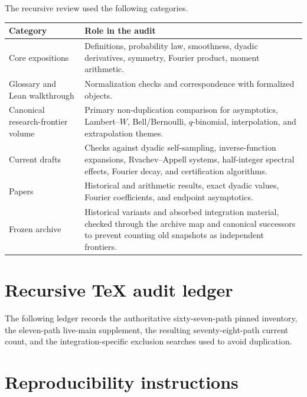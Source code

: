 \documentclass[11pt,oneside]{article}
\theoremstyle{definition}
\theoremstyle{remark}
\newcommand{\1}{\mathbf 1}
\begin{document}
The recursive review used the following categories.
\begin{longtable}{@{}p{}p{}@{}}
\toprule
Category&Role in the audit\\
\midrule
Core expositions&Definitions, probability law, smoothness, dyadic derivatives, symmetry,
Fourier product, moment arithmetic.\\
Glossary and Lean walkthrough&Normalization checks and correspondence with formalized
objects.\\
Canonical research-frontier volume&Primary non-duplication comparison for asymptotics,
Lambert--\(W\), Bell/Bernoulli, \(q\)-binomial, interpolation, and extrapolation themes.\\
Current drafts&Checks against dyadic self-sampling, inverse-function expansions,
Rvachev--Appell systems, half-integer spectral effects, Fourier decay, and certification
algorithms.\\
Papers&Historical and arithmetic results, exact dyadic values, Fourier coefficients, and
endpoint asymptotics.\\
Frozen archive&Historical variants and absorbed integration material, checked through the
archive map and canonical successors to prevent counting old snapshots as independent
frontiers.\\
\bottomrule
\end{longtable}

\section{Recursive TeX audit ledger}
\label{p10:app:complete-manifest}

The following ledger records the authoritative sixty-seven-path pinned inventory, the
eleven-path live-main supplement, the resulting seventy-eight-path current count, and the
integration-specific exclusion searches used to avoid duplication.

\lstset{
  basicstyle=\ttfamily\tiny,
  breaklines=true,
  columns=fullflexible,
  frame=single,
  showstringspaces=false
}


\section{Reproducibility instructions}
\end{document}
